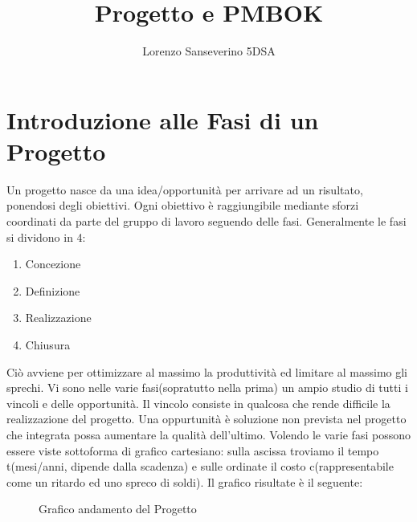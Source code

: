 \documentclass{article}
\title{Progetto e PMBOK}
\author{Lorenzo Sanseverino 5DSA}
\begin{document}
\tableofcontents
\maketitle




\section{Introduzione alle Fasi di un Progetto}
Un progetto nasce da una idea/opportunità per arrivare ad un risultato, ponendosi degli obiettivi.
Ogni obiettivo è raggiungibile mediante sforzi coordinati da parte del gruppo di lavoro seguendo delle fasi.
Generalmente le fasi si dividono in 4:

\begin{enumerate}
\item Concezione
\item Definizione
\item Realizzazione
\item Chiusura	
\end{enumerate}

Ciò avviene per ottimizzare al massimo la produttività ed limitare al massimo gli sprechi.
Vi sono nelle varie fasi(sopratutto nella prima) un ampio studio di tutti i vincoli e delle opportunità.
Il vincolo consiste in qualcosa che rende difficile la realizzazione del progetto.
Una oppurtunità è soluzione non prevista nel progetto che integrata possa aumentare la qualità dell'ultimo.
Volendo le varie fasi possono essere viste sottoforma di grafico cartesiano:
sulla ascissa troviamo il tempo t(mesi/anni, dipende dalla scadenza) e sulle ordinate il costo c(rappresentabile come un ritardo ed uno spreco di soldi).
Il grafico risultate è il seguente:
\begin{figure}[h!]
\caption{Grafico andamento del Progetto}
\label{grap1}
\end{figure}
\end{document}
